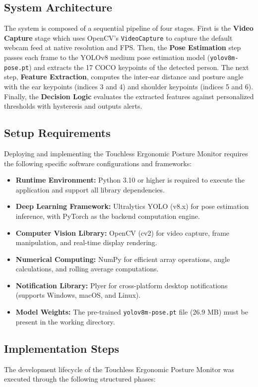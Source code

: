 \documentclass{llncs}
\begin{document}
\subsection{System Architecture}
The system is composed of a sequential pipeline of four stages. First is the \textbf{Video Capture} stage which uses OpenCV's \texttt{VideoCapture} to capture the default webcam feed at native resolution and FPS. Then, the \textbf{Pose Estimation} step passes each frame to the YOLOv8 medium pose estimation model (\texttt{yolov8m-pose.pt}) and extracts the 17 COCO keypoints of the detected person. The next step, \textbf{Feature Extraction}, computes the inter-ear distance and posture angle with the ear keypoints (indices 3 and 4) and shoulder keypoints (indices 5 and 6). Finally, the \textbf{Decision Logic} evaluates the extracted features against personalized thresholds with hysteresis and outputs alerts.

\subsection{Setup Requirements}
Deploying and implementing the Touchless Ergonomic Posture Monitor requires the following specific software configurations and frameworks:
\begin{itemize}
    \item \textbf{Runtime Environment:} Python 3.10 or higher is required to execute the application and support all library dependencies.
    \item \textbf{Deep Learning Framework:} Ultralytics YOLO (v8.x) for pose estimation inference, with PyTorch as the backend computation engine.
    \item \textbf{Computer Vision Library:} OpenCV (cv2) for video capture, frame manipulation, and real-time display rendering.
    \item \textbf{Numerical Computing:} NumPy for efficient array operations, angle calculations, and rolling average computations.
    \item \textbf{Notification Library:} Plyer for cross-platform desktop notifications (supports Windows, macOS, and Linux).
    \item \textbf{Model Weights:} The pre-trained \texttt{yolov8m-pose.pt} file (26.9 MB) must be present in the working directory.
\end{itemize}

\subsection{Implementation Steps}
The development lifecycle of the Touchless Ergonomic Posture Monitor was executed through the following structured phases:
\end{document}
